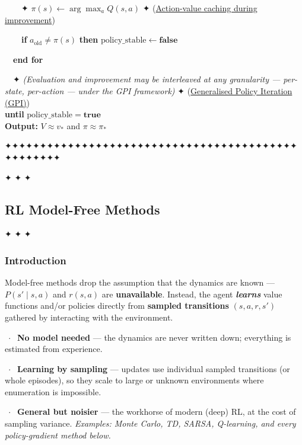 \documentclass[11pt]{article}
\begin{document}
\begin{pseudobox}
\strut ~~~~✦ \(\pi(s) \leftarrow \arg\max_a Q(s,a)\) ✦
(\hyperref[trick-1-2-4]{Action-value caching during improvement})\\
\strut ~~~~\textbf{if} \(a_{\text{old}} \neq \pi(s)\) \textbf{then}
\(\text{policy\_stable} \leftarrow \mathbf{false}\)\\
\strut ~~\textbf{end for}\\
\strut ~~✦ \emph{(Evaluation and improvement may be interleaved at any
granularity --- per-state, per-action --- under the GPI framework)} ✦
(\hyperref[trick-1-2-2]{Generalised Policy Iteration (GPI)})\\
\textbf{until} \(\text{policy\_stable} = \mathbf{true}\)\\
\textbf{Output:} \(V \approx v_{*}\) and \(\pi \approx \pi_{*}\)

\end{pseudobox}

    ✦✦✦✦✦✦✦✦✦✦✦✦✦✦✦✦✦✦✦✦✦✦✦✦✦✦✦✦✦✦✦✦✦✦✦✦✦✦✦✦✦✦✦✦✦✦✦✦✦✦

    \clearpage

✦ ✦ ✦

\subsection{RL Model-Free Methods}\label{rl-model-free-methods}

✦ ✦ ✦

    \label{model-free-intro}

    \subsubsection{Introduction}\label{introduction}

Model-free methods drop the assumption that the dynamics are known ---
\(P(s' \mid s, a)\) and \(r(s, a)\) are \textbf{unavailable}. Instead,
the agent \textbf{\emph{learns}} value functions and/or policies
directly from \textbf{sampled transitions} \((s, a, r, s')\) gathered by
interacting with the environment.

\(\;\cdot\;\) \textbf{No model needed} --- the dynamics are never
written down; everything is estimated from experience.

\(\;\cdot\;\) \textbf{Learning by sampling} --- updates use individual
sampled transitions (or whole episodes), so they scale to large or
unknown environments where enumeration is impossible.

\(\;\cdot\;\) \textbf{General but noisier} --- the workhorse of modern
(deep) RL, at the cost of sampling variance. \emph{Examples: Monte
Carlo, TD, SARSA, Q-learning, and every policy-gradient method below.}
\end{document}
